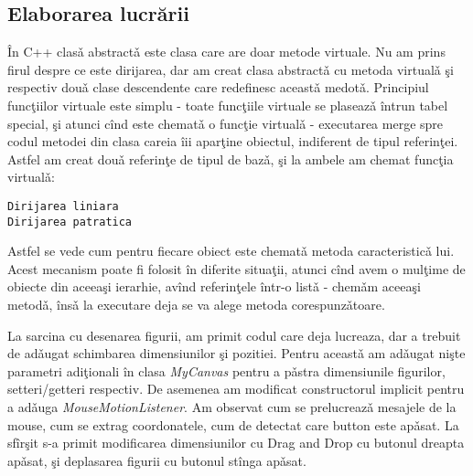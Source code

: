 \subsection{Elaborarea lucr\u{a}rii}
\^{I}n C++ clas\v{a} abstract\v{a} este clasa care are doar metode virtuale. Nu am prins firul
despre ce este dirijarea, dar am creat clasa abstract\v{a} cu metoda virtual\v{a} \c{s}i respectiv
dou\v{a} clase descendente care redefinesc aceast\v{a} medot\v{a}. Principiul func\c{t}iilor virtuale
este simplu - toate func\c{t}iile virtuale se plaseaz\v{a} \^{i}ntrun tabel special, \c{s}i atunci c\^{i}nd
este chemat\v{a} o func\c{t}ie virtual\v{a} - executarea merge spre codul metodei din clasa careia 
\^{i}ii apar\c{t}ine obiectul, indiferent de tipul referin\c{t}ei. Astfel am creat dou\v{a} referin\c{t}e de tipul de baz\v{a}, \c{s}i la ambele am chemat func\c{t}ia virtual\v{a}:
\begin{verbatim}
Dirijarea liniara
Dirijarea patratica
\end{verbatim}
Astfel se vede cum pentru fiecare obiect este chemat\v{a} metoda caracteristic\v{a} lui. Acest mecanism
poate fi folosit \^{i}n diferite situa\c{t}ii, atunci c\^{i}nd avem o mul\c{t}ime de obiecte din aceea\c{s}i ierarhie, av\^{i}nd referin\c{t}ele \^{i}ntr-o list\v{a} - chem\v{a}m aceea\c{s}i metod\v{a}, \^{i}ns\v{a}
la executare deja se va alege metoda corespunz\v{a}toare.

La sarcina cu desenarea figurii, am primit codul care deja lucreaza, dar a trebuit de ad\v{a}ugat
schimbarea dimensiunilor \c{s}i pozitiei. Pentru aceast\v{a} am ad\v{a}ugat ni\c{s}te parametri 
adi\c{t}ionali \^{i}n clasa \emph{MyCanvas} pentru a p\v{a}stra dimensiunile figurilor,
setteri/getteri respectiv. De asemenea am modificat constructorul implicit pentru a ad\v{a}uga
\emph{MouseMotionListener}. Am observat cum se prelucreaz\v{a} mesajele de la mouse, cum se extrag
coordonatele, cum de detectat care button este ap\v{a}sat.
La sf\^{i}r\c{s}it s-a primit modificarea dimensiunilor cu Drag and Drop cu butonul dreapta ap\v{a}sat,
\c{s}i deplasarea figurii cu butonul st\^{i}nga ap\v{a}sat.
